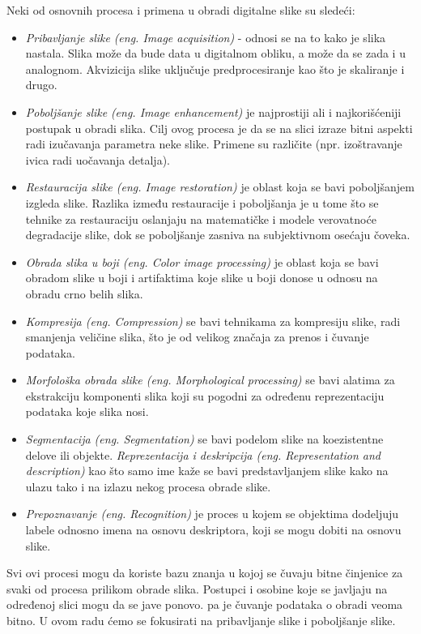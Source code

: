\documentclass[a4paper,12pt,titlepage]{article}
\begin{document}
Neki od osnovnih procesa i primena u obradi digitalne slike su sledeći:
\begin{itemize}
\item \emph{Pribavljanje slike} \emph{(eng. Image acquisition)} - odnosi se na to kako je slika nastala. Slika može da bude data u digitalnom obliku, a može da se zada i u analognom. Akvizicija slike uključuje predprocesiranje kao što je skaliranje i drugo.
\item \emph{Poboljšanje slike} \emph{(eng. Image enhancement)} je najprostiji ali i najkorišćeniji postupak u obradi slika. Cilj ovog procesa je da se na slici izraze bitni aspekti radi izučavanja parametra neke slike. Primene su različite (npr. izoštravanje ivica radi uočavanja detalja).
\item \emph{Restauracija slike (eng. Image restoration)} je oblast koja se bavi poboljšanjem izgleda slike. Razlika između restauracije i poboljšanja je u tome što se tehnike za restauraciju oslanjaju na matematičke i modele verovatnoće degradacije slike, dok se poboljšanje zasniva na subjektivnom osećaju čoveka. 
\item \emph{Obrada slika u boji (eng. Color image processing)} je oblast koja se bavi obradom slike u boji i artifaktima koje slike u boji donose u odnosu na obradu crno belih slika. 
\item \emph{Kompresija (eng. Compression)} se bavi tehnikama za kompresiju slike, radi smanjenja veličine slika, što je od velikog značaja za prenos i čuvanje podataka. 
\item \emph{Morfološka obrada slike (eng. Morphological processing)} se bavi alatima za ekstrakciju komponenti slika koji su pogodni za određenu reprezentaciju podataka koje slika nosi.
\item  \emph{Segmentacija (eng. Segmentation)} se bavi podelom slike na koezistentne delove ili objekte. \emph{Reprezentacija i deskripcija (eng. Representation and description)} kao što samo ime kaže se bavi predstavljanjem slike kako na ulazu tako i na izlazu nekog procesa obrade slike. 
\item  \emph{Prepoznavanje (eng. Recognition)} je proces u kojem se objektima dodeljuju labele odnosno imena na osnovu deskriptora, koji se mogu dobiti na osnovu slike. 
\end{itemize}

Svi ovi procesi mogu da koriste bazu znanja u kojoj se čuvaju bitne činjenice za svaki od procesa prilikom obrade slika. Postupci i osobine koje se javljaju na određenoj slici mogu da se jave ponovo. pa je čuvanje podataka o obradi veoma bitno. U ovom radu ćemo se fokusirati na pribavljanje slike i poboljšanje slike.
\end{document}
